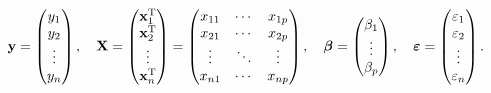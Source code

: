 \begin{equation}
   \mathbf{y} = \begin{pmatrix} y_1 \\ y_2 \\ \vdots \\ y_n \end{pmatrix}, \quad
   \mathbf{X} = \begin{pmatrix} \mathbf{x}^{\rm T}_1 \\ \mathbf{x}^{\rm T}_2 \\ \vdots \\ \mathbf{x}^{\rm T}_n \end{pmatrix}
   = \begin{pmatrix} x_{11} & \cdots & x_{1p} \\
   x_{21} & \cdots & x_{2p} \\
   \vdots & \ddots & \vdots \\
   x_{n1} & \cdots & x_{np}
   \end{pmatrix}, \quad
   \boldsymbol\beta = \begin{pmatrix} \beta_1 \\ \vdots \\ \beta_p \end{pmatrix}, \quad
   \boldsymbol\varepsilon = \begin{pmatrix} \varepsilon_1 \\ \varepsilon_2 \\ \vdots \\ \varepsilon_n \end{pmatrix}.
\end{equation}

